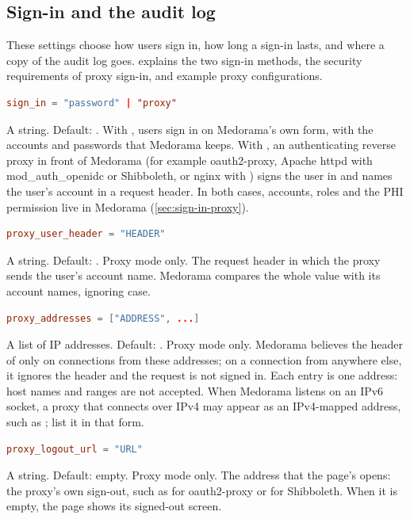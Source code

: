 \subsection{Sign-in and the audit log}
\label{sec:settings-reference-sessions}

These settings choose how users sign in, how long a sign-in lasts, and where a copy of the audit
log goes.  explains the two sign-in methods, the security requirements of
proxy sign-in, and example proxy configurations.

\begin{lstlisting}[style=signature,language=TOML]
sign_in = "password" | "proxy"
\end{lstlisting}
A string. Default: . With , users sign in on Medorama's own
form, with the accounts and passwords that Medorama keeps. With , an
authenticating reverse proxy in front of Medorama (for example oauth2-proxy, Apache httpd with
mod\_auth\_openidc or Shibboleth, or nginx with ) signs the user in and names
the user's account in a request header. In both cases, accounts, roles and the PHI permission
live in Medorama (\cref{sec:sign-in-proxy}).

\begin{lstlisting}[style=signature,language=TOML]
proxy_user_header = "HEADER"
\end{lstlisting}
A string. Default: . Proxy mode only. The request header in which the
proxy sends the user's account name. Medorama compares the whole value with its account names,
ignoring case.

\begin{lstlisting}[style=signature,language=TOML]
proxy_addresses = ["ADDRESS", ...]
\end{lstlisting}
A list of IP addresses. Default: \code{["127.0.0.1", "::1"]}. Proxy mode only. Medorama
believes the header of  only on connections from these addresses; on a
connection from anywhere else, it ignores the header and the request is not signed in. Each entry
is one address: host names and ranges are not accepted. When Medorama listens on an IPv6 socket,
a proxy that connects over IPv4 may appear as an IPv4-mapped address, such as
; list it in that form.

\begin{lstlisting}[style=signature,language=TOML]
proxy_logout_url = "URL"
\end{lstlisting}
A string. Default: empty. Proxy mode only. The address that the page's  opens: the
proxy's own sign-out, such as  for oauth2-proxy or
 for Shibboleth. When it is empty, the page shows its
signed-out screen.

